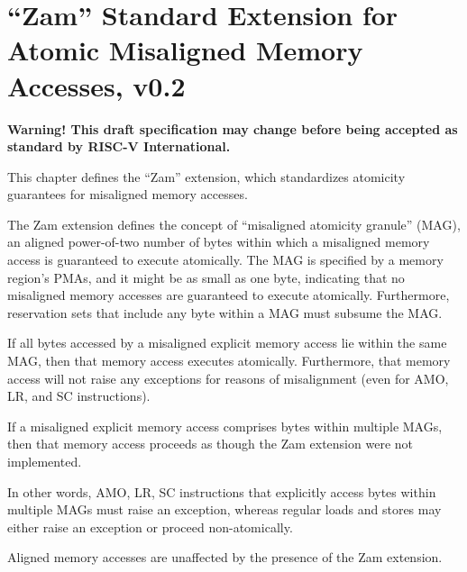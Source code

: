 \chapter{``Zam'' Standard Extension for Atomic Misaligned Memory Accesses, v0.2}
\label{sec:zam}

{\bf Warning! This draft specification may change before being
accepted as standard by RISC-V International.}

This chapter defines the ``Zam'' extension, which standardizes atomicity
guarantees for misaligned memory accesses.

The Zam extension defines the concept of ``misaligned atomicity granule''
(MAG), an aligned power-of-two number of bytes within which a misaligned
memory access is guaranteed to execute atomically.
The MAG is specified by a memory region's PMAs, and it might be as small as
one byte, indicating that no misaligned memory accesses are guaranteed to
execute atomically.
Furthermore, reservation sets that include any byte within a MAG must
subsume the MAG.

If all bytes accessed by a misaligned explicit memory access lie within the
same MAG, then that memory access executes atomically.
Furthermore, that memory access will not raise any exceptions for reasons
of misalignment (even for AMO, LR, and SC instructions).

If a misaligned explicit memory access comprises bytes within multiple MAGs,
then that memory access proceeds as though the Zam extension were not
implemented.

\begin{commentary}
In other words, AMO, LR, SC instructions that explicitly access bytes within
multiple MAGs must raise an exception, whereas regular loads and
stores may either raise an exception or proceed non-atomically.
\end{commentary}

Aligned memory accesses are unaffected by the presence of the Zam extension.
